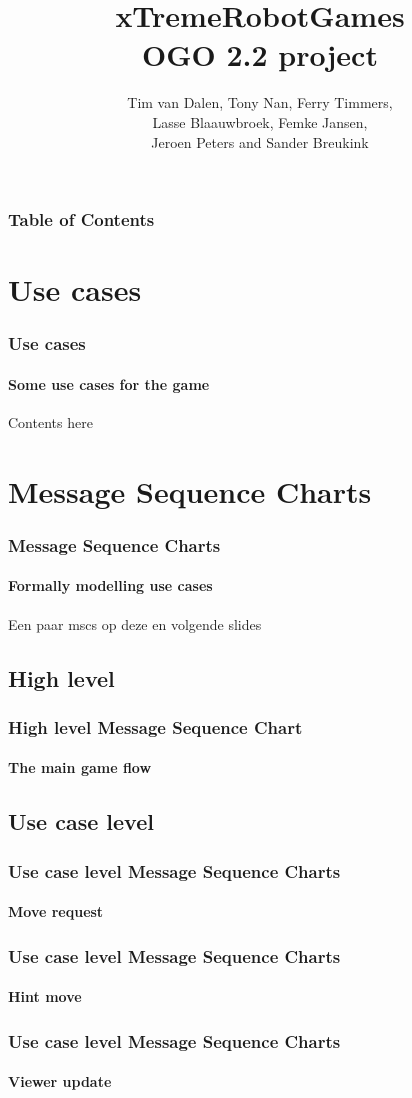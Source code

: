 \documentclass{beamer}
\title{xTremeRobotGames\\\small OGO 2.2 project}
\author{Tim van Dalen, Tony Nan, Ferry Timmers,\\ 
                Lasse Blaauwbroek, Femke Jansen,\\
                Jeroen Peters and Sander Breukink\\}
\institute[TU/e]{}
\begin{document}
	\frame{\titlepage}
	
	\begin{frame}
	    \frametitle{Table of Contents}
    		\tableofcontents
  	\end{frame}

	\section{Use cases}
	\begin{frame}
		\frametitle{Use cases}
		\framesubtitle{Some use cases for the game}
		Contents here
	\end{frame}

	\section{Message Sequence Charts}
	\begin{frame}
		\frametitle{Message Sequence Charts}
		\framesubtitle{Formally modelling use cases}
		Een paar mscs op deze en volgende slides
	\end{frame}
	
	\subsection{High level}
	\begin{frame}
		\frametitle{High level Message Sequence Chart}
		\framesubtitle{The main game flow}
		
	\end{frame}
	\subsection{Use case level}

	\begin{frame}
		\frametitle{Use case level Message Sequence Charts}
		\framesubtitle{Move request}
		\scalebox{0.9}{
			
		}
		
	\end{frame}
	\begin{frame}
		\frametitle{Use case level Message Sequence Charts}
		\framesubtitle{Hint move}
		\scalebox{0.8}{
			
		}
		
	\end{frame}
	\begin{frame}
		\frametitle{Use case level Message Sequence Charts}
		\framesubtitle{Viewer update}
		\scalebox{0.8}{
			
		}
	\end{frame}
\end{document}
